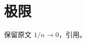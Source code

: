 \documentclass[UTF8,fontset=fandol]{ctexart}
\begin{document}
\section{极限}
\begin{mdframed}[style=sample]
保留原文 $1/n\to0$，引用\cite{ExactBook}。
\end{mdframed}
\end{document}
